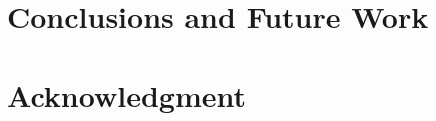 \section{Conclusions and Future Work}

\label{conclusion}


 \label{Future Work}





\section*{Acknowledgment}
